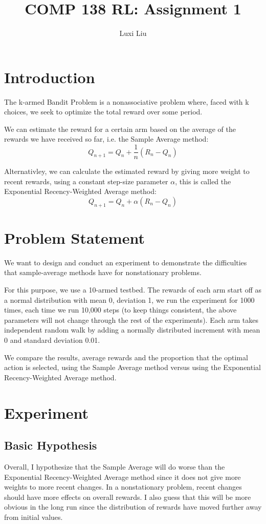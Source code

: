 \documentclass{article}
\title{COMP 138 RL: Assignment 1}
\author{Luxi Liu}
\begin{document}
\maketitle

\section{Introduction}
The k-armed Bandit Problem is a nonassociative problem where, faced with k choices, we seek to optimize the total reward over some period. 

We can estimate the reward for a certain arm based on the average of the rewards we have received so far, i.e. the Sample Average method: $$Q_{n+1} = Q_n + \frac{1}{n} (R_n - Q_n)$$

Alternativley, we can calculate the estimated reward by giving more weight to recent rewards, using a constant step-size parameter $\alpha$, this is called the Exponential Recency-Weighted Average method: $$Q_{n+1} = Q_n + \alpha (R_n - Q_n)$$

\section{Problem Statement}
We want to design and conduct an experiment to demonstrate the
difficulties that sample-average methods have for nonstationary problems. 

For this purpose, we use a 10-armed testbed. The rewards of each arm start off as a normal distribution with mean 0, deviation 1, we run the experiment for 1000 times, each time we run 10,000 steps (to keep things consistent, the above parameters will not change through the rest of the experiments). Each arm takes independent random walk by adding a normally distributed increment with mean 0 and standard deviation 0.01. 

We compare the results, average rewards and the proportion that the optimal action is selected, using the Sample Average method versus using the Exponential Recency-Weighted Average method.

\section{Experiment}
\subsection{Basic Hypothesis}
Overall, I hypothesize that the Sample Average will do worse than the Exponential Recency-Weighted Average method since it does not give more weights to more recent changes. In a nonstationary problem, recent changes should have more effects on overall rewards. I also guess that this will be more obvious in the long run since the distribution of rewards have moved further away from initial values.
\end{document}
